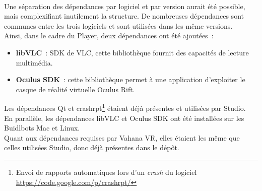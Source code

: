 \ \\
Une séparation
des dépendances par logiciel et par version aurait été possible, mais complexifiant inutilement 
la structure. De nombreuses dépendances sont communes entre les trois logiciels et
sont utilisées dans les même versions. \\
\newline
Ainsi, dans le cadre du Player, deux dépendances ont été ajoutées~:
\begin{itemize}
  \item \textbf{libVLC}~: SDK de VLC, cette bibliothèque fournit des capacités de lecture multimédia.\cite{libvlc}
  \item \textbf{Oculus SDK}~: cette bibliothèque permet à une application d'exploiter le 
  casque de réalité virtuelle Oculus Rift.\cite{oculus-developer-guide}
\end{itemize}
Les dépendances Qt et crashrpt\footnote{Envoi de rapports automatiques lors d'un
\textit{crash} du logiciel \url{https://code.google.com/p/crashrpt/}} étaient déjà 
présentes et utilisées par Studio.\\
En parallèle, les dépendances libVLC et Oculus SDK ont été installées sur les Buidlbots Mac et Linux.\\
Quant aux dépendances requises par Vahana VR, elles étaient les même que celles 
utilisées Studio, donc déjà présentes dans le dépôt.\\

